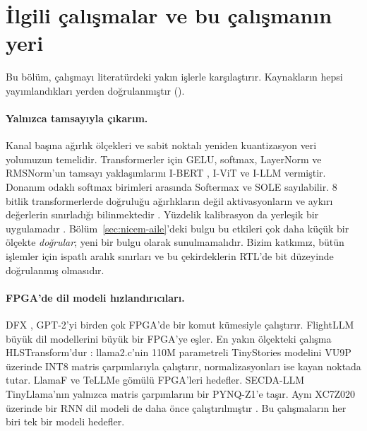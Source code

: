 \section{İlgili çalışmalar ve bu çalışmanın yeri}\label{sec:ilgili}

Bu bölüm, çalışmayı literatürdeki yakın işlerle karşılaştırır. Kaynakların hepsi yayımlandıkları yerden doğrulanmıştır
().

\paragraph{Yalnızca tamsayıyla çıkarım.} Kanal başına ağırlık ölçekleri ve sabit noktalı yeniden kuantizasyon
\cite{jacob2018integer,wu2020integer,nagel2021white} veri yolumuzun temelidir. Transformerler için GELU, softmax,
LayerNorm ve RMSNorm'un tamsayı yaklaşımlarını I-BERT \cite{kim2021ibert}, I-ViT \cite{li2023ivit} ve I-LLM
\cite{hu2024illm} vermiştir. Donanım odaklı softmax birimleri arasında Softermax \cite{stevens2021softermax} ve SOLE
\cite{wang2023sole} sayılabilir. 8 bitlik transformerlerde doğruluğu ağırlıkların değil aktivasyonların ve aykırı
değerlerin sınırladığı bilinmektedir \cite{bondarenko2021understanding,dettmers2022llmint8,xiao2023smoothquant}.
Yüzdelik kalibrasyon da yerleşik bir uygulamadır \cite{migacz2017tensorrt,mckinstry2019discovering}. Bölüm~\ref{sec:nicem-aile}'deki
bulgu bu etkileri çok daha küçük bir ölçekte \emph{doğrular}; yeni bir bulgu olarak sunulmamalıdır. Bizim katkımız,
bütün işlemler için ispatlı aralık sınırları ve bu çekirdeklerin RTL'de bit düzeyinde doğrulanmış olmasıdır.

\paragraph{FPGA'de dil modeli hızlandırıcıları.} DFX \cite{hong2022dfx}, GPT-2'yi birden çok FPGA'de bir komut kümesiyle
çalıştırır. FlightLLM \cite{zeng2024flightllm} büyük dil modellerini büyük bir FPGA'ye eşler. En yakın ölçekteki çalışma
HLSTransform'dur \cite{he2024hlstransform}: llama2.c'nin 110M parametreli TinyStories modelini VU9P üzerinde INT8
matris çarpımlarıyla çalıştırır, normalizasyonları ise kayan noktada tutar. LlamaF \cite{xu2024llamaf} ve TeLLMe
\cite{qiao2026tellme} gömülü FPGA'leri hedefler. SECDA-LLM \cite{haris2024secdallm} TinyLlama'nın yalnızca matris
çarpımlarını bir PYNQ-Z1'e taşır. Aynı XC7Z020 üzerinde bir RNN dil modeli de daha önce çalıştırılmıştır
\cite{hao2017drnn}. Bu çalışmaların her biri tek bir modeli hedefler.

